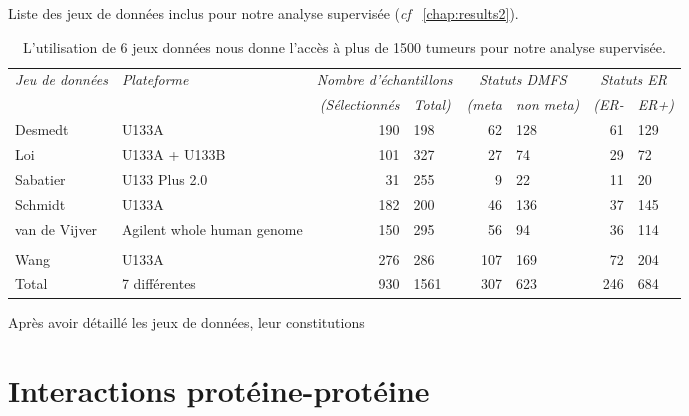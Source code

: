 			\begin{table}
				\begin{center}
					\caption{Liste des jeux de données inclus pour notre analyse supervisée \citep{Garcia2012} (\emph{cf} ~\ref{chap:results2}).}
					\begin{tabular}{llr@{/}lr@{/}lr@{/}l}
						\toprule
						\emph{Jeu de données} & \emph{Plateforme}	& \multicolumn{2}{c}{\emph{Nombre d'échantillons}}	& \multicolumn{2}{c}{\emph{Statuts DMFS}} & \multicolumn{2}{c}{\emph{Statuts ER}} \\
						\cmidrule(r){3-8}
						&  & \emph{(Sélectionnés} & \emph{Total)}	& \emph{(meta} & \emph{non meta)} & \emph{(ER-}	& \emph{ER+)} \\
						\midrule
						Desmedt						& U133A												& 190	&198	& 62	& 128	& 61	& 129	\\
						Loi							& U133A + U133B										& 101	&327	& 27	& 74	& 29	& 72	\\
						Sabatier					& U133 Plus 2.0										& 31	&255	& 9		& 22	& 11	& 20	\\
						Schmidt						& U133A												& 182	&200	& 46	& 136	& 37	& 145	\\
						van de Vijver				& \multirow{2}{2.49cm}{Agilent whole human genome}	& 150	&295	& 56	& 94	& 36	& 114	\\
						& \\
						Wang						& U133A												& 276	&286	& 107	& 169	& 72	& 204	\\
						\midrule
						Total						& 7 différentes										& 930	&1561	& 307	& 623	& 246	& 684	\\
						\bottomrule
					\end{tabular}
					\label{tab:Met:DSS}
					\vspace{5ex}
					\caption*{L'utilisation de 6 jeux données nous donne l'accès à plus de 1500 tumeurs pour notre analyse supervisée.}
				\end{center}
			\end{table}

			Après avoir détaillé les jeux de données, leur constitutions

	\section{\textcolor{mygreen}{Interactions protéine-protéine}}\label{sec:IPP}

